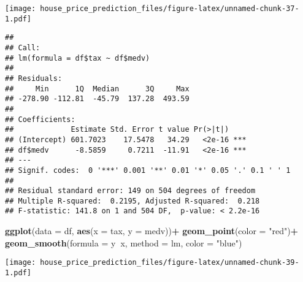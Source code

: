 \documentclass[
]{article}
\newenvironment{Shaded}{\begin{snugshade}}{\end{snugshade}}
\newcommand{\DataTypeTok}[1]{\textcolor[rgb]{0.13,0.29,0.53}{#1}}
\newcommand{\KeywordTok}[1]{\textcolor[rgb]{0.13,0.29,0.53}{\textbf{#1}}}
\newcommand{\NormalTok}[1]{#1}
\newcommand{\OperatorTok}[1]{\textcolor[rgb]{0.81,0.36,0.00}{\textbf{#1}}}
\newcommand{\StringTok}[1]{\textcolor[rgb]{0.31,0.60,0.02}{#1}}
\begin{document}
\texttt{[image: house\_price\_prediction\_files/figure-latex/unnamed-chunk-37-1.pdf]}

\begin{Shaded}
\end{Shaded}

\begin{verbatim}
## 
## Call:
## lm(formula = df$tax ~ df$medv)
## 
## Residuals:
##     Min      1Q  Median      3Q     Max 
## -278.90 -112.81  -45.79  137.28  493.59 
## 
## Coefficients:
##             Estimate Std. Error t value Pr(>|t|)    
## (Intercept) 601.7023    17.5478   34.29   <2e-16 ***
## df$medv      -8.5859     0.7211  -11.91   <2e-16 ***
## ---
## Signif. codes:  0 '***' 0.001 '**' 0.01 '*' 0.05 '.' 0.1 ' ' 1
## 
## Residual standard error: 149 on 504 degrees of freedom
## Multiple R-squared:  0.2195, Adjusted R-squared:  0.218 
## F-statistic: 141.8 on 1 and 504 DF,  p-value: < 2.2e-16
\end{verbatim}

\begin{Shaded}
\begin{Highlighting}[]
\KeywordTok{ggplot}\NormalTok{(}\DataTypeTok{data =}\NormalTok{ df, }\KeywordTok{aes}\NormalTok{(}\DataTypeTok{x =}\NormalTok{ tax, }\DataTypeTok{y =}\NormalTok{ medv))}\OperatorTok{+}
\StringTok{  }\KeywordTok{geom_point}\NormalTok{(}\DataTypeTok{color =} \StringTok{"red"}\NormalTok{)}\OperatorTok{+}
\StringTok{  }\KeywordTok{geom_smooth}\NormalTok{(}\DataTypeTok{formula =}\NormalTok{ y}\OperatorTok{~}\NormalTok{x, }\DataTypeTok{method =}\NormalTok{ lm, }\DataTypeTok{color =} \StringTok{"blue"}\NormalTok{)}
\end{Highlighting}
\end{Shaded}

\texttt{[image: house\_price\_prediction\_files/figure-latex/unnamed-chunk-39-1.pdf]}

\begin{Shaded}
\end{Shaded}
\end{document}
